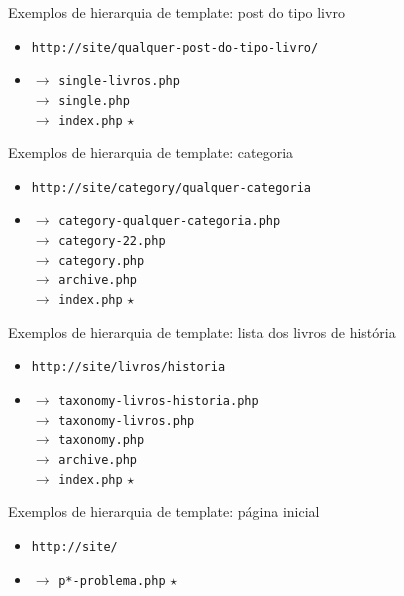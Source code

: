 \documentclass{beamer}
\begin{document}
\begin{frame}{Exemplos de hierarquia de template: post do tipo livro}
\begin{itemize}
  \pause \item \texttt{http://site/qualquer-post-do-tipo-livro/}
  \pause \item $\rightarrow$ \texttt{single-livros.php} \\
    \pause $\rightarrow$ \texttt{single.php} \\
    \pause $\rightarrow$ \texttt{index.php} $\star$
\end{itemize}
\end{frame}

\begin{frame}{Exemplos de hierarquia de template: categoria}
\begin{itemize}
  \pause \item \texttt{http://site/category/qualquer-categoria}
  \pause \item $\rightarrow$ \texttt{category-qualquer-categoria.php} \\
    \pause $\rightarrow$ \texttt{category-22.php} \\
    \pause $\rightarrow$ \texttt{category.php} \\
    \pause $\rightarrow$ \texttt{archive.php} \\
    \pause $\rightarrow$ \texttt{index.php} $\star$
\end{itemize}
\end{frame}

\begin{frame}{Exemplos de hierarquia de template: lista dos livros de história}
\begin{itemize}
  \pause \item \texttt{http://site/livros/historia}
  \pause \item $\rightarrow$ \texttt{taxonomy-livros-historia.php} \\
    \pause $\rightarrow$ \texttt{taxonomy-livros.php} \\
    \pause $\rightarrow$ \texttt{taxonomy.php} \\
    \pause $\rightarrow$ \texttt{archive.php} \\
    \pause $\rightarrow$ \texttt{index.php} $\star$
\end{itemize}
\end{frame}

\begin{frame}{Exemplos de hierarquia de template: página inicial}
\begin{itemize}
  \pause \item \texttt{http://site/}
  \pause \item $\rightarrow$ \texttt{p*-problema.php} $\star$
\end{itemize}
\end{frame}
\end{document}
